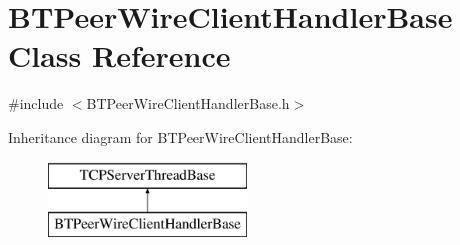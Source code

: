 \hypertarget{classBTPeerWireClientHandlerBase}{}\section{B\+T\+Peer\+Wire\+Client\+Handler\+Base Class Reference}
\label{classBTPeerWireClientHandlerBase}


{\ttfamily \#include $<$B\+T\+Peer\+Wire\+Client\+Handler\+Base.\+h$>$}

Inheritance diagram for B\+T\+Peer\+Wire\+Client\+Handler\+Base\+:\begin{figure}[H]
\begin{center}
\leavevmode
\includegraphics[height=2.000000cm]{classBTPeerWireClientHandlerBase}
\end{center}
\end{figure}
